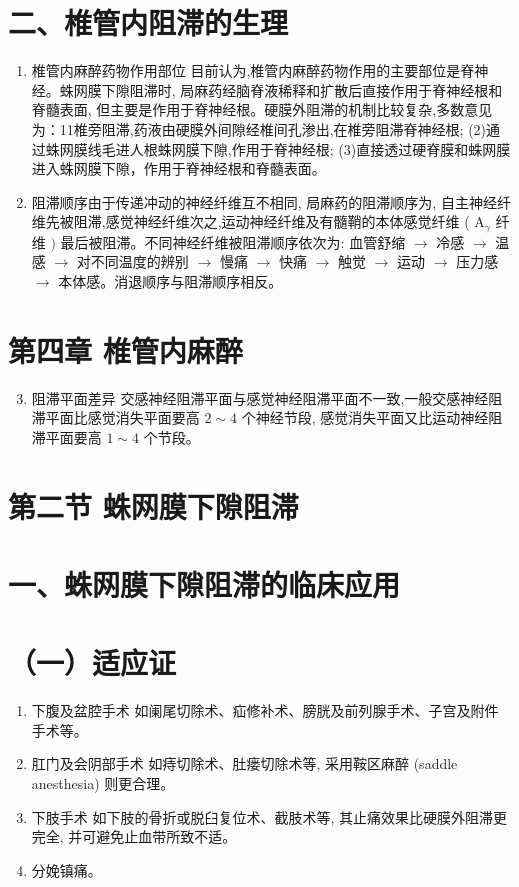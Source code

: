 \documentclass[10pt]{article}
\begin{document}
\section*{二、椎管内阻滞的生理}
\begin{enumerate}
  \item 椎管内麻醉药物作用部位 目前认为,椎管内麻醉药物作用的主要部位是脊神经。蛛网膜下隙阻滞时, 局麻药经脑脊液稀释和扩散后直接作用于脊神经根和脊髓表面, 但主要是作用于脊神经根。硬膜外阻滞的机制比较复杂,多数意见为：11椎旁阻滞,药液由硬膜外间隙经椎间孔渗出,在椎旁阻滞脊神经根; (2)通过蛛网膜线毛进人根蛛网膜下隙,作用于脊神经根; (3)直接透过硬脊膜和蛛网膜进入蛛网膜下隙，作用于脊神经根和脊髓表面。

  \item 阻滞顺序由于传递冲动的神经纤维互不相同, 局麻药的阻滞顺序为, 自主神经纤维先被阻滞,感觉神经纤维次之,运动神经纤维及有髓鞘的本体感觉纤维 ( $\mathrm{A}_{\gamma}$ 纤维 $)$ 最后被阻滞。不同神经纤维被阻滞顺序依次为: 血管舒缩 $\rightarrow$ 冷感 $\rightarrow$ 温感 $\rightarrow$ 对不同温度的辨别 $\rightarrow$ 慢痛 $\rightarrow$ 快痛 $\rightarrow$ 触觉 $\rightarrow$ 运动 $\rightarrow$ 压力感 $\rightarrow$ 本体感。消退顺序与阻滞顺序相反。

\end{enumerate}

\section*{第四章 椎管内麻醉}
\begin{enumerate}
  \setcounter{enumi}{2}
  \item 阻滞平面差异 交感神经阻滞平面与感觉神经阻滞平面不一致,一般交感神经阻滞平面比感觉消失平面要高 $2 \sim 4$ 个神经节段, 感觉消失平面又比运动神经阻滞平面要高 $1 \sim 4$ 个节段。
\end{enumerate}

\section*{第二节 蛛网膜下隙阻滞}
\section*{一、蛛网膜下隙阻滞的临床应用}
\section*{（一）适应证}
\begin{enumerate}
  \item 下腹及盆腔手术 如阑尾切除术、疝修补术、膀胱及前列腺手术、子宫及附件手术等。

  \item 肛门及会阴部手术 如痔切除术、肚瘘切除术等, 采用鞍区麻醉 (saddle anesthesia) 则更合理。

  \item 下肢手术 如下肢的骨折或脱臼复位术、截肢术等, 其止痛效果比硬膜外阻滞更完全, 并可避免止血带所致不适。

  \item 分娩镇痛。

\end{enumerate}
\end{document}
